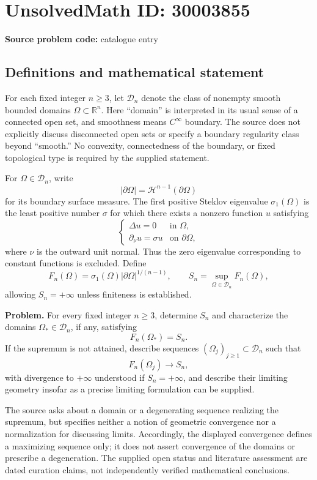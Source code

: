\documentclass[11pt]{article}
\newcommand{\R}{\mathbb{R}}
\begin{document}
\section*{UnsolvedMath ID: 30003855}
\textbf{Source problem code:} catalogue entry
\subsection{Definitions and mathematical statement}
For each fixed integer \(n\geq 3\), let \(\mathcal D_n\) denote the class of nonempty smooth bounded domains \(\Omega\subset\R^n\). Here ``domain'' is interpreted in its usual sense of a connected open set, and smoothness means \(C^\infty\) boundary. The source does not explicitly discuss disconnected open sets or specify a boundary regularity class beyond ``smooth.'' No convexity, connectedness of the boundary, or fixed topological type is required by the supplied statement.

For \(\Omega\in\mathcal D_n\), write
\[
|\partial\Omega|=\mathcal H^{n-1}(\partial\Omega)
\]
for its boundary surface measure. The first positive Steklov eigenvalue \(\sigma_1(\Omega)\) is the least positive number \(\sigma\) for which there exists a nonzero function \(u\) satisfying
\[
\begin{cases}
\Delta u=0 & \text{in }\Omega,\\
\partial_\nu u=\sigma u & \text{on }\partial\Omega,
\end{cases}
\]
where \(\nu\) is the outward unit normal. Thus the zero eigenvalue corresponding to constant functions is excluded. Define
\[
F_n(\Omega)=\sigma_1(\Omega)|\partial\Omega|^{1/(n-1)},
\qquad
S_n=\sup_{\Omega\in\mathcal D_n}F_n(\Omega),
\]
allowing \(S_n=+\infty\) unless finiteness is established.

\textbf{Problem.} For every fixed integer \(n\geq3\), determine \(S_n\) and characterize the domains \(\Omega_*\in\mathcal D_n\), if any, satisfying
\[
F_n(\Omega_*)=S_n.
\]
If the supremum is not attained, describe sequences \((\Omega_j)_{j\geq1}\subset\mathcal D_n\) such that
\[
F_n(\Omega_j)\longrightarrow S_n,
\]
with divergence to \(+\infty\) understood if \(S_n=+\infty\), and describe their limiting geometry insofar as a precise limiting formulation can be supplied.

The source asks about a domain or a degenerating sequence realizing the supremum, but specifies neither a notion of geometric convergence nor a normalization for discussing limits. Accordingly, the displayed convergence defines a maximizing sequence only; it does not assert convergence of the domains or prescribe a degeneration. The supplied open status and literature assessment are dated curation claims, not independently verified mathematical conclusions.
\end{document}
